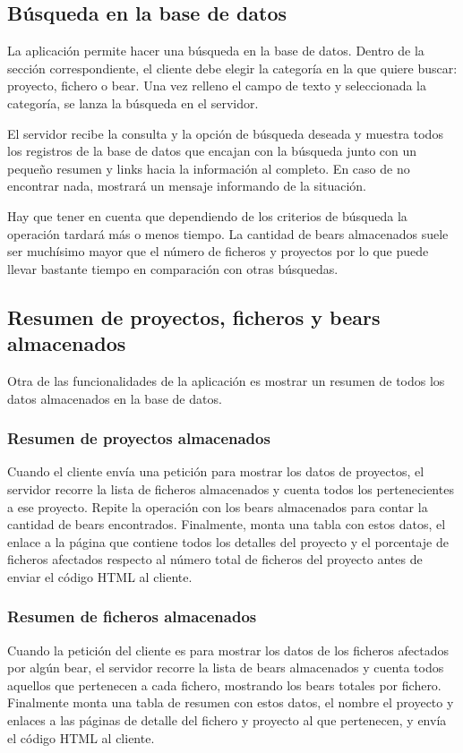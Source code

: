 \documentclass[a4paper, 12pt]{book}
\begin{document}
\subsection{Búsqueda en la base de datos}
\label{sec:seccion12.2}
La aplicación permite hacer una búsqueda en la base de datos. Dentro de la sección correspondiente, el cliente debe elegir la categoría en la que quiere buscar: proyecto, fichero o bear. Una vez relleno el campo de texto y seleccionada la categoría, se lanza la búsqueda en el servidor.

El servidor recibe la consulta y la opción de búsqueda deseada y muestra todos los registros de la base de datos que encajan con la búsqueda junto con un pequeño resumen y links hacia la información al completo. En caso de no encontrar nada, mostrará un mensaje informando de la situación.

Hay que tener en cuenta que dependiendo de los criterios de búsqueda la operación tardará más o menos tiempo. La cantidad de bears almacenados suele ser muchísimo mayor que el número de ficheros y proyectos por lo que puede llevar bastante tiempo en comparación con otras búsquedas.

\subsection{Resumen de proyectos, ficheros y bears almacenados}
\label{sec:seccion12.3}
Otra de las funcionalidades de la aplicación es mostrar un resumen de todos los datos almacenados en la base de datos.

\subsubsection{Resumen de proyectos almacenados}
\label{sec:section12.3.1}
Cuando el cliente envía una petición para mostrar los datos de proyectos, el servidor recorre la lista de ficheros almacenados y cuenta todos los pertenecientes a ese proyecto. Repite la operación con los bears almacenados para contar la cantidad de bears encontrados. Finalmente, monta una tabla con estos datos, el enlace a la página que contiene todos los detalles del proyecto y el porcentaje de ficheros afectados respecto al número total de ficheros del proyecto antes de enviar el código HTML al cliente.

\subsubsection{Resumen de ficheros almacenados}
\label{sec:section12.3.2}
Cuando la petición del cliente es para mostrar los datos de los ficheros afectados por algún bear, el servidor recorre la lista de bears almacenados y cuenta todos aquellos que pertenecen a cada fichero, mostrando los bears totales por fichero. Finalmente monta una tabla de resumen con estos datos, el nombre el proyecto y enlaces a las páginas de detalle del fichero y proyecto al que pertenecen, y envía el código HTML al cliente.
\end{document}
